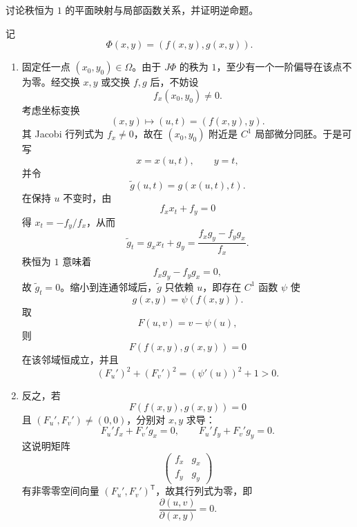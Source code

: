 \begin{xreferenceproblem}[20.5.2 第一组参考题 6]
讨论秩恒为 $1$ 的平面映射与局部函数关系，并证明逆命题。
\end{xreferenceproblem}
\begin{xsolution}
记
\[
  \Phi(x,y)=(f(x,y),g(x,y)).
\]

\begin{enumerate}[label=(\arabic*)]
  \item 固定任一点 $(x_0,y_0)\in\Omega$。由于 $J\Phi$ 的秩为 $1$，至少有一个一阶偏导在该点不为零。经交换 $x,y$ 或交换 $f,g$ 后，不妨设
  \[
    f_x(x_0,y_0)\ne0.
  \]
  考虑坐标变换
  \[
    (x,y)\longmapsto(u,t)=(f(x,y),y).
  \]
  其 Jacobi 行列式为 $f_x\ne0$，故在 $(x_0,y_0)$ 附近是 $C^1$ 局部微分同胚。于是可写
  \[
    x=x(u,t),\qquad y=t,
  \]
  并令
  \[
    \widetilde g(u,t)=g(x(u,t),t).
  \]
  在保持 $u$ 不变时，由
  \[
    f_xx_t+f_y=0
  \]
  得 $x_t=-f_y/f_x$，从而
  \[
    \widetilde g_t
    =g_xx_t+g_y
    =\frac{f_xg_y-f_yg_x}{f_x}.
  \]
  秩恒为 $1$ 意味着
  \[
    f_xg_y-f_yg_x=0,
  \]
  故 $\widetilde g_t=0$。缩小到连通邻域后，$\widetilde g$ 只依赖 $u$，即存在 $C^1$ 函数 $\psi$ 使
  \[
    g(x,y)=\psi(f(x,y)).
  \]
  取
  \[
    F(u,v)=v-\psi(u),
  \]
  则
  \[
    F(f(x,y),g(x,y))=0
  \]
  在该邻域恒成立，并且
  \[
    (F_u')^2+(F_v')^2=(\psi'(u))^2+1>0.
  \]

  \item 反之，若
  \[
    F(f(x,y),g(x,y))=0
  \]
  且 $(F_u',F_v')\ne(0,0)$，分别对 $x,y$ 求导：
  \[
    F_u'f_x+F_v'g_x=0,
    \qquad
    F_u'f_y+F_v'g_y=0.
  \]
  这说明矩阵
  \[
    \begin{pmatrix}f_x&g_x\\f_y&g_y\end{pmatrix}
  \]
  有非零零空间向量 $(F_u',F_v')^{\mathsf T}$，故其行列式为零，即
  \[
    \boxed{\displaystyle
      \frac{\partial(u,v)}{\partial(x,y)}=0}.
  \]
\end{enumerate}
\end{xsolution}

